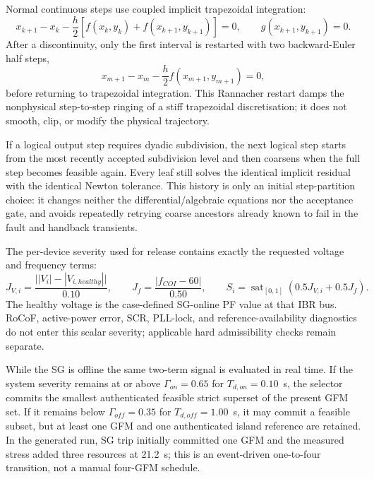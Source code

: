 \documentclass[12pt,a4paper]{article}
\begin{document}
Normal continuous steps use coupled implicit trapezoidal integration:
\begin{equation}
x_{k+1}-x_k-\frac{h}{2}\left[f(x_k,y_k)+f(x_{k+1},y_{k+1})\right]=0,\qquad
g(x_{k+1},y_{k+1})=0.
\end{equation}
After a discontinuity, only the first interval is restarted with two backward-Euler half steps,
\begin{equation}
x_{m+1}-x_m-\frac{h}{2}f(x_{m+1},y_{m+1})=0,
\end{equation}
before returning to trapezoidal integration. This Rannacher restart damps the nonphysical
step-to-step ringing of a stiff trapezoidal discretisation; it does not smooth, clip, or modify the
physical trajectory.

If a logical output step requires dyadic subdivision, the next logical step starts from the most
recently accepted subdivision level and then coarsens when the full step becomes feasible again.
Every leaf still solves the identical implicit residual with the identical Newton tolerance. This
history is only an initial step-partition choice: it changes neither the differential/algebraic
equations nor the acceptance gate, and avoids repeatedly retrying coarse ancestors already known
to fail in the fault and handback transients.

The per-device severity used for release contains exactly the requested voltage and frequency
terms:
\begin{equation}
J_{V,i}=\frac{\bigl||V_i|-|V_{i,healthy}|\bigr|}{0.10},\qquad
J_f=\frac{|f_{COI}-60|}{0.50},\qquad
S_i=\operatorname{sat}_{[0,1]}\!\left(0.5J_{V,i}+0.5J_f\right).
\end{equation}
The healthy voltage is the case-defined SG-online PF value at that IBR bus. RoCoF, active-power
error, SCR, PLL-lock, and reference-availability diagnostics do not enter this scalar severity;
applicable hard admissibility checks remain separate.

While the SG is offline the same two-term signal is evaluated in real time. If the system severity
remains at or above $\Gamma_{on}=0.65$ for $T_{d,on}=0.10$~s, the selector commits the smallest
authenticated feasible strict superset of the present GFM set. If it remains below
$\Gamma_{off}=0.35$ for $T_{d,off}=1.00$~s, it may commit a feasible subset, but at least one GFM
and one authenticated island reference are retained. In the generated run, SG trip initially
committed one GFM and the measured stress added three resources at 21.2~s; this is an event-driven
one-to-four transition, not a manual four-GFM schedule.
\end{document}

